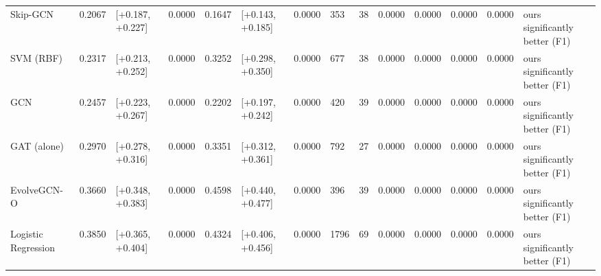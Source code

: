 \begin{table}
\begin{tabular}{llllllllllllll}
Skip-GCN & 0.2067 & [+0.187, +0.227] & 0.0000 & 0.1647 & [+0.143, +0.185] & 0.0000 & 353 & 38 & 0.0000 & 0.0000 & 0.0000 & 0.0000 & ours significantly better (F1) \\
SVM (RBF) & 0.2317 & [+0.213, +0.252] & 0.0000 & 0.3252 & [+0.298, +0.350] & 0.0000 & 677 & 38 & 0.0000 & 0.0000 & 0.0000 & 0.0000 & ours significantly better (F1) \\
GCN & 0.2457 & [+0.223, +0.267] & 0.0000 & 0.2202 & [+0.197, +0.242] & 0.0000 & 420 & 39 & 0.0000 & 0.0000 & 0.0000 & 0.0000 & ours significantly better (F1) \\
GAT (alone) & 0.2970 & [+0.278, +0.316] & 0.0000 & 0.3351 & [+0.312, +0.361] & 0.0000 & 792 & 27 & 0.0000 & 0.0000 & 0.0000 & 0.0000 & ours significantly better (F1) \\
EvolveGCN-O & 0.3660 & [+0.348, +0.383] & 0.0000 & 0.4598 & [+0.440, +0.477] & 0.0000 & 396 & 39 & 0.0000 & 0.0000 & 0.0000 & 0.0000 & ours significantly better (F1) \\
Logistic Regression & 0.3850 & [+0.365, +0.404] & 0.0000 & 0.4324 & [+0.406, +0.456] & 0.0000 & 1796 & 69 & 0.0000 & 0.0000 & 0.0000 & 0.0000 & ours significantly better (F1) \\
\bottomrule
\end{tabular}
\end{table}
